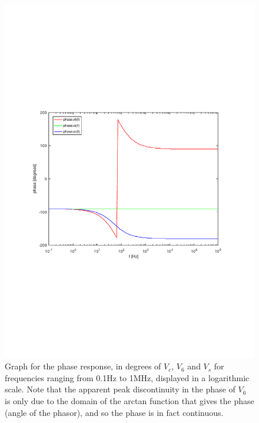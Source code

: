 \begin{figure}[H] \centering
\includegraphics[width=0.9\linewidth]{angle_tab.pdf}
\caption{Graph for the phase response, in degrees of $V_c$, $V_6$ and $V_s$ for frequencies ranging from 0.1Hz to 1MHz, displayed in a logarithmic scale. Note that the apparent peak discontinuity in the phase of $V_6$ is only due to the domain of the arctan function that gives the phase (angle of the phasor), and so the phase is in fact continuous.}
\label{fig:angle_resp}
\end{figure}

\pagebreak


